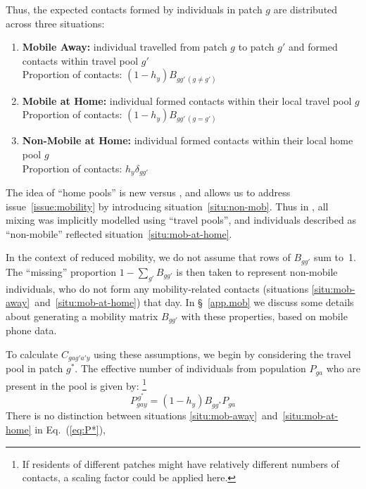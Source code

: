 Thus, the expected contacts formed by individuals in patch $g$ are distributed across three situations:
\begin{enumerate}
  \item \textbf{Mobile Away:}\label{situ:mob-away}
  individual travelled from patch $g$ to patch $g'$ and formed contacts within travel pool $g'$\\
  Proportion of contacts: $(1-h_y) B_{gg' \, (g \ne g')}$
  \item \textbf{Mobile at Home:}\label{situ:mob-at-home}
  individual formed contacts within their local travel pool $g$\\
  Proportion of contacts: $(1-h_y) B_{gg' \, (g = g')}$
  \item \textbf{Non-Mobile at Home:}\label{situ:non-mob}
  individual formed contacts within their local home pool $g$\\
  Proportion of contacts: $h_y \delta_{gg'}$
\end{enumerate}
The idea of ``home pools'' is new versus \cite{Arenas2020},
and allows us to address issue~\ref{issue:mobility}
by introducing situation~\ref{situ:non-mob}.
Thus in \cite{Arenas2020}, all mixing was implicitly modelled using ``travel pools'',
and individuals described as ``non-mobile'' reflected situation~\ref{situ:mob-at-home}.
\par
In the context of reduced mobility, we do not assume that rows of $B_{gg'}$ sum to~1.
The ``missing'' proportion $1 - \sum_{g'} B_{gg'}$ is then taken to represent
non-mobile individuals, who do not form any mobility-related contacts
(situations \ref{situ:mob-away}~and~\ref{situ:mob-at-home}) that day.
In \S~\ref{app.mob} we discuss some details about
generating a mobility matrix $B_{gg'}$ with these properties, based on mobile phone data.
\par
To calculate $C_{gag'a'y}$ using these assumptions,
we begin by considering the travel pool in patch $g^*$.
The effective number of individuals from population $P_{ga}$
who are present in the pool is given by:%
\footnote{If residents of different patches might have relatively different numbers of contacts,
  a scaling factor could be applied here.}
\begin{equation}\label{eq:P*}
  P^{\,g^*}_{gay} = (1-h_y) B_{gg^*} P_{ga}
\end{equation}
There is no distinction between situations \ref{situ:mob-away}~and~\ref{situ:mob-at-home}
in Eq.~(\ref{eq:P*}),

